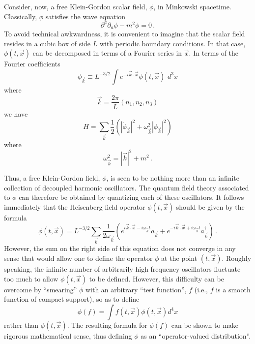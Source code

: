 Consider, now, a free Klein-Gordon scalar field, $\phi$, in Minkowski
spacetime. Classically, $\phi$ satisfies the wave equation
\begin{equation}
\partial^a \partial_a \phi - m^2 \phi = 0 \, .
\end{equation}
To avoid technical awkwardness, it is convenient to imagine that the
scalar field resides in a cubic box of side $L$ with periodic boundary
conditions. In that case, $\phi(t, \vec{x})$ can be decomposed in
terms of a Fourier series in $\vec{x}$. In terms of the Fourier coefficients
\begin{equation}
\phi_{\vec{k}} \equiv L^{-3/2} \int 
e^{-i\vec{k} \cdot \vec{x}} \phi(t, \vec{x}) \,\, d^3 x
\end{equation}
where 
\begin{equation}
\vec{k} = \frac{2 \pi}{L} (n_1, n_2, n_3)
\end{equation}
we have
\begin{equation}
H = \sum_{\vec{k}} \frac{1}{2} \left(|\dot{\phi}_{\vec{k}}|^2 
+ \omega^2_{\vec{k}} |\phi_{\vec{k}}|^2 \right)
\end{equation}
where
\begin{equation}
\omega^2_{\vec{k}} = |\vec{k}|^2 + m^2 \, .
\end{equation}

Thus, a free Klein-Gordon field, $\phi$, is seen to be nothing more
than an infinite collection of decoupled harmonic oscillators. The
quantum field theory associated to $\phi$ can therefore be obtained by
quantizing each of these oscillators. It follows immediately that the
Heisenberg field operator $\phi (t, \vec{x})$ should be given by the formula
\begin{equation}
\phi (t, \vec{x}) = L^{-3/2} \sum_{\vec{k}} \frac{1}{2 \omega_{\vec{k}}}
\left(e^{i \vec{k} \cdot \vec{x} -i \omega_{\vec{k}} t} a_{\vec{k}} 
+ e^{-i \vec{k} \cdot \vec{x} + i \omega_{\vec{k}} t} a^\dagger_{\vec{k}}  
\right) \, .
\label{phi}
\end{equation}
However, the sum on the right side of this equation does not converge
in any sense that would allow one to define the operator $\phi$ at the
point $(t, \vec{x})$. Roughly speaking, the infinite number of arbitrarily
high frequency oscillators fluctuate too much to allow $\phi (t,
\vec{x})$ to be defined. However, this difficulty can be overcome by
``smearing'' $\phi$ with an arbitrary ``test function'', $f$ (i.e., 
$f$ is a smooth
function of compact support), so as to define 
\begin{equation}
\phi(f) = \int f(t, \vec{x}) \phi (t, \vec{x}) d^4x 
\end{equation}
rather than $\phi (t, \vec{x})$. The resulting formula 
for $\phi(f)$ can be shown to make
rigorous mathematical sense, thus defining $\phi$ as an
``operator-valued distribution''.

